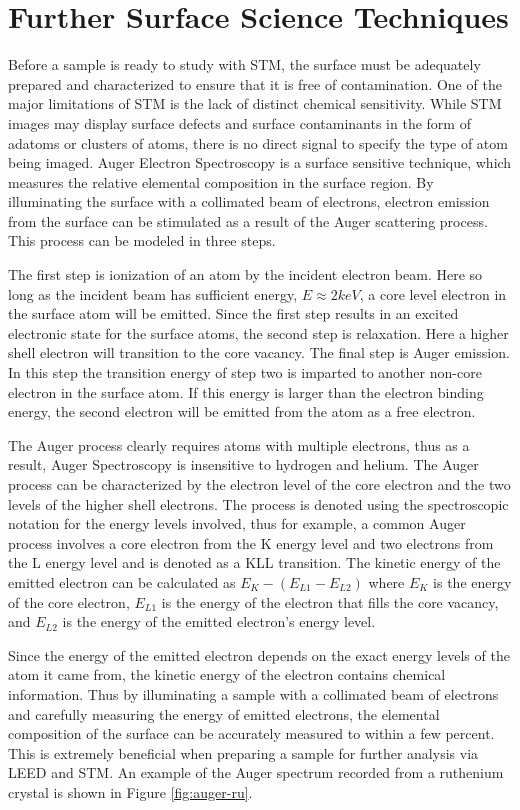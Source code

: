 \section{Further Surface Science Techniques}
Before a sample is ready to study with STM, the surface must be adequately prepared and characterized to ensure that it is free of contamination. One of the major limitations of STM is the lack of distinct chemical sensitivity. While STM images may display surface defects and surface contaminants in the form of adatoms or clusters of atoms, there is no direct signal to specify the type of atom being imaged. Auger Electron Spectroscopy is a surface sensitive technique, which measures the relative elemental composition in the surface region. By illuminating the surface with a collimated beam of electrons, electron emission from the surface can be stimulated as a result of the Auger scattering process. This process can be modeled in three steps. 

The first step is ionization of an atom by the incident electron beam. Here so long as the incident beam has sufficient energy, $E \approx 2keV$, a core level electron in the surface atom will be emitted. Since the first step results in an excited electronic state for the surface atoms, the second step is relaxation. Here a higher shell electron will transition to the core vacancy. The final step is Auger emission. In this step the transition energy of step two is imparted to another non-core electron in the surface atom. If this energy is larger than the electron binding energy, the second electron will be emitted from the atom as a free electron.

The Auger process clearly requires atoms with multiple electrons, thus as a result, Auger Spectroscopy is insensitive to hydrogen and helium. The Auger process can be characterized by the electron level of the core electron and the two levels of the higher shell electrons. The process is denoted using the spectroscopic notation for the energy levels involved, thus for example, a common Auger process involves a core electron from the K energy level and two electrons from the L energy level and is denoted as a KLL transition. The kinetic energy of the emitted electron can be calculated as $E_K - (E_{L1} - E_{L2})$ where $E_K$ is the energy of the core electron, $E_{L1}$ is the energy of the electron that fills the core vacancy, and $E_{L2}$ is the energy of the emitted electron's energy level.

Since the energy of the emitted electron depends on the exact energy levels of the atom it came from, the kinetic energy of the electron contains chemical information. Thus by illuminating a sample with a collimated beam of electrons and carefully measuring the energy of emitted electrons, the elemental composition of the surface can be accurately measured to within a few percent. This is extremely beneficial when preparing a sample for further analysis via LEED and STM. An example of the Auger spectrum recorded from a ruthenium crystal is shown in Figure \ref{fig:auger-ru}.

